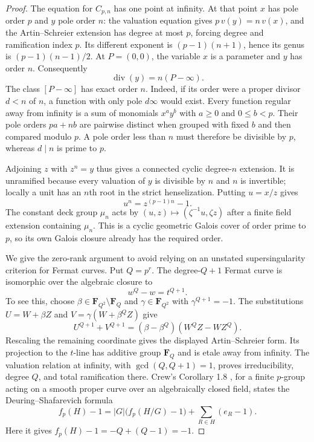 \documentclass[11pt]{article}
\begin{document}
\begin{proof}
The equation for $C_{p,n}$ has one point at infinity. At that
point $x$ has pole order $p$ and $y$ pole order $n$:
the valuation equation gives $p\,v(y)=n\,v(x)$, and the
Artin--Schreier extension has degree at most $p$, forcing
degree and ramification index $p$. Its different exponent is
$(p-1)(n+1)$, hence its genus is $(p-1)(n-1)/2$.
At $P=(0,0)$, the variable $x$ is a parameter and $y$ has
order $n$. Consequently
\[
                          \operatorname{div}(y)=n(P-\infty).
\]
The class $[P-\infty]$ has exact order $n$. Indeed, if its
order were a proper divisor $d<n$ of $n$, a function with
only pole $d\infty$ would exist. Every function regular away
from infinity is a sum of monomials $x^a y^b$ with $a\ge0$
and $0\le b<p$. Their pole orders $pa+nb$ are pairwise
distinct when grouped with fixed $b$ and then compared
modulo $p$. A pole order less than $n$ must therefore be
divisible by $p$, whereas $d\mid n$ is prime to $p$.

Adjoining $z$ with $z^n=y$ thus gives a connected cyclic
degree-$n$ extension. It is unramified because every
valuation of $y$ is divisible by $n$ and $n$ is invertible;
locally a unit has an $n$th root in the strict henselization.
Putting $u=x/z$ gives
\[
                           u^n=z^{(p-1)n}-1.
\]
The constant deck group $\mu_n$ acts by
$(u,z)\mapsto(\zeta^{-1}u,\zeta z)$ after a finite field
extension containing $\mu_n$. This is a cyclic geometric
Galois cover of order prime to $p$, so its own Galois closure
already has the required order.

We give the zero-rank argument to avoid relying on an
unstated supersingularity criterion for Fermat curves. Put
$Q=p^r$. The degree-$Q+1$ Fermat curve is isomorphic over
the algebraic closure to
\[
                        w^Q-w=t^{Q+1}.
\]
To see this, choose $\beta\in\mathbf F_{Q^2}\setminus\mathbf F_Q$
and $\gamma\in\mathbf F_{Q^2}$ with $\gamma^{Q+1}=-1$.
The substitutions
$U=W+\beta Z$ and $V=\gamma(W+\beta^Q Z)$ give
\[
 U^{Q+1}+V^{Q+1}
       =(\beta-\beta^Q)(W^QZ-WZ^Q).
\]
Rescaling the remaining coordinate gives the displayed
Artin--Schreier form. Its projection to the $t$-line has
additive group $\mathbf F_Q$ and is etale away from infinity.
The valuation relation at infinity, with
$\gcd(Q,Q+1)=1$, proves irreducibility, degree $Q$, and
total ramification there. Crew's Corollary 1.8
\cite{AG_Crew1984}, for a finite $p$-group acting on a
smooth proper curve over an algebraically closed field,
states the Deuring--Shafarevich formula
\[
 f_p(H)-1=|G|\bigl(f_p(H/G)-1\bigr)
                       +\sum_{R\in H}(e_R-1).
\]
Here it gives $f_p(H)-1=-Q+(Q-1)=-1$.


\end{proof}
\end{document}
